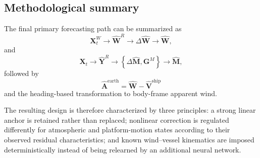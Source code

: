 \subsection{Methodological summary}
\label{subsec:method_summary}

The final primary forecasting path can be summarized as
\begin{equation}
\mathbf X_t^{W}
\rightarrow
\hat{\mathbf W}^{R}
\rightarrow
\Delta\hat{\mathbf W}
\rightarrow
\hat{\mathbf W},
\label{eq:summary_wind}
\end{equation}
and
\begin{equation}
\mathbf X_t
\rightarrow
\hat{\mathbf Y}^{R}
\rightarrow
\left\{
\Delta\hat{\mathbf M},
\mathbf G^M
\right\}
\rightarrow
\hat{\mathbf M},
\label{eq:summary_motion}
\end{equation}
followed by
\begin{equation}
\boxed{
\hat{\mathbf A}^{\mathrm{earth}}
=
\hat{\mathbf W}
-
\hat{\mathbf V}^{\mathrm{ship}}
}
\label{eq:summary_apparent}
\end{equation}
and the heading-based transformation to body-frame apparent wind.

The resulting design is therefore characterized by three principles: a strong linear anchor is retained rather than replaced; nonlinear correction is regulated differently for atmospheric and platform-motion states according to their observed residual characteristics; and known wind--vessel kinematics are imposed deterministically instead of being relearned by an additional neural network.
